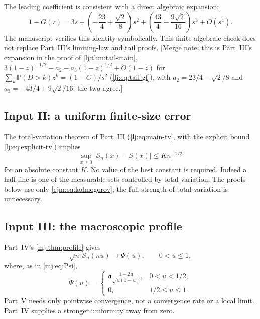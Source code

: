 \documentclass[11pt,a4paper]{article}
\theoremstyle{definition}\newaliascnt{definition}{theorem}
\theoremstyle{remark}\newaliascnt{remark}{theorem}
\newcommand{\ljP}{\mathbb P}
\begin{document}
The leading coefficient is consistent with a direct algebraic expansion:
\begin{equation}
 1-G(z)=3s+
 \left(-\frac{23}{4}+\frac{\sqrt2}{8}\right)s^2+
 \left(\frac{43}{4}-\frac{9\sqrt2}{16}\right)s^3+O(s^4).
 \label{cjm:eq:pgf-expansion}
\end{equation}
The manuscript verifies this identity symbolically. This finite algebraic
check does not replace Part~III's limiting-law and tail proofs.
[Merge note: this is Part~III's expansion in the proof of
\cref{lj:thm:tail-main}, $3(1-z)^{-1/2}-a_2-a_3(1-z)^{1/2}+O(1-z)$ for
$\sum_k\ljP(D>k)z^k=(1-G)/s^2$ (\eqref{lj:eq:tail-gf}), with
$a_2=23/4-\sqrt2/8$ and $a_3=-43/4+9\sqrt2/16$; the two agree.]

\subsection{Input II: a uniform finite-size error}
The total-variation theorem of Part~III (\eqref{lj:eq:main-tv}, with the
explicit bound \eqref{lj:eq:explicit-tv}) implies
\begin{equation}
 \sup_{x\ge0}|\mathcal S_n(x)-\mathcal S(x)|\le K n^{-1/2}
 \label{cjm:eq:kolmogorov}
\end{equation}
for an absolute constant $K$. No value of the best constant is required.
Indeed a half-line is one of the measurable sets controlled by total
variation. The proofs below use only \eqref{cjm:eq:kolmogorov}; the full
strength of total variation is unnecessary.

\subsection{Input III: the macroscopic profile}
Part~IV's \cref{mj:thm:profile} gives
\begin{equation}
 \sqrt n\,\mathcal S_n(nu)\longrightarrow\Psi(u),\qquad 0<u\le1,
 \label{cjm:eq:bulk-limit}
\end{equation}
where, as in \eqref{mj:eq:Psi},
\begin{equation}
 \Psi(u)=
 \begin{cases}
 \displaystyle \mathfrak a\frac{1-2u}{\sqrt{u(1-u)}},&0<u<1/2,\\[4pt]
 0,&1/2\le u\le1.
 \end{cases}
 \label{cjm:eq:bulk-profile}
\end{equation}
Part~V needs only pointwise convergence, not a convergence rate or a local
limit. Part~IV supplies a stronger uniformity away from zero.
\end{document}
